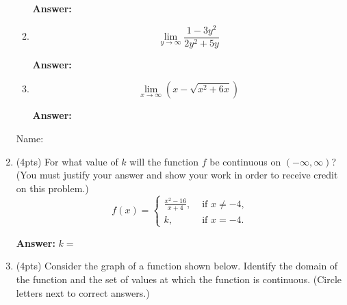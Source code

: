 \documentclass[fleqn,12pt]{article}
\newcommand{\<}{\ensuremath{\langle}}
\renewcommand{\>}{\ensuremath{\rangle}}
\begin{document}
\begin{enumerate}[label={\bf \arabic*.}]
\begin{enumerate}[label={\bf \roman*.}]
      \bigskip
      \hfill {\bf Answer:} \underline{\phantom{XXXXXXX}}
      \bigskip


      \bigskip
    \item 
      \label{item:5}
      \[
      \lim_{y\rightarrow \infty} \frac{1-3y^2}{2y^2+5y} 
      \]

      \bigskip

      \bigskip
      \hfill {\bf Answer:} \underline{\phantom{XXXXXXX}}
      \bigskip


      \bigskip
    \item 
      \label{item:6}
      \[
      \lim_{x\rightarrow \infty} (x - \sqrt{x^2 + 6x})
      \]

      \bigskip

      \bigskip
      \hfill {\bf Answer:} \underline{\phantom{XXXXXXX}}
      \bigskip



    \end{enumerate}

    \newpage

\begin{flushright}
  Name: \underline{\phantom{XXXXXXXXXXXXXXXXX}}
\end{flushright}

  \item (4pts) For what value of $k$ will the function $f$ be continuous on 
    $(-\infty,\infty)$? (You must justify your answer and show your work in order to
    receive credit on this problem.)
    \[
    f(x) = 
    \begin{cases}
      \frac{x^2 - 16}{x + 4}, & \text{ if } x \neq -4,\\
      k, & \text{ if } x = -4.
    \end{cases}
    \]

    \vskip4cm

    \hfill {\bf Answer:} $k = $ \underline{\phantom{XXXXXXXXXX}}

    \vskip1cm

  \item (4pts) Consider the graph of a function shown below.  
    Identify the domain of the function and the set of values at which the
    function is continuous. (Circle letters next to correct answers.)


\end{enumerate}
\end{document}
